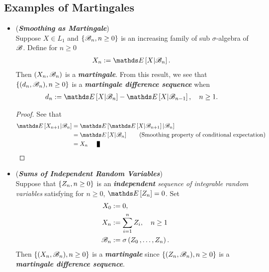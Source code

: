 \documentclass[11pt]{article}
\begin{document}
\subsection{Examples of Martingales}
\begin{itemize}
\item \begin{example} (\textbf{\emph{Smoothing as Martingale}})\\
Suppose $X \in L_1$ and $\left\{{\mathscr B}_n, n \ge 0\right\}$ is an increasing family of sub $\sigma$-algebra of ${\mathscr B}$. Define for $n \ge 0$
\begin{align*}
X_n &:= \E{}{X | \srB_n}.
\end{align*}
Then $(X_n, {\mathscr B}_n)$ is a \emph{\textbf{martingale}}. From this result, we see that $\left\{(d_n, {\mathscr B}_n), n \ge 0\right\}$ is a \emph{\textbf{martingale difference sequence}} when 
\begin{align}
d_n &:= \E{}{X | \srB_n} - \E{}{X | \srB_{n-1}}, \quad n\ge 1. \label{eqn: smoothing_martingale_difference}
\end{align}
\end{example}
\begin{proof}
See that 
\begin{align*}
\E{}{X_{n+1} | \srB_{n}} &= \E{}{ \E{}{X | \srB_{n+1}} | \srB_n} \\
&= \E{}{X | \srB_{n}}  \qquad \text{(Smoothing property of conditional expectation)}\\
&= X_n \qed
\end{align*} 
\end{proof}

\item \begin{example}(\emph{\textbf{Sums of Independent Random Variables}}) \\
Suppose that $\left\{Z_n, n \ge 0\right\}$ is an \emph{\textbf{independent} sequence of integrable random variables} satisfying for $n \ge 0$, 
$\E{}{Z_n} = 0$.  Set
\begin{align*}
X_0 &:= 0,\\
X_n &:= \sum_{i=1}^{n}Z_i, \quad n \ge 1 \\
{\mathscr B}_n &:= \sigma\left(Z_0 \,{,}\ldots{,}\, Z_n\right).
\end{align*} Then $\left\{(X_n, {\mathscr B}_n), n \ge 0\right\}$ is a \emph{\textbf{martingale}} since $\left\{(Z_n, {\mathscr B}_n), n \ge 0\right\}$ is a \emph{\textbf{martingale difference sequence}}.
\end{example}



\end{itemize}
\end{document}
